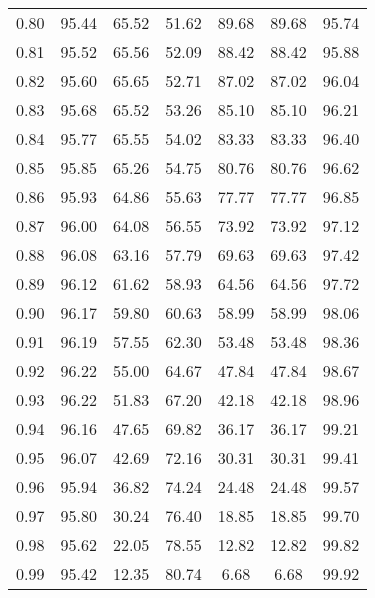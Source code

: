 \begin{tabular}{|c|c|c|c|c|c|c|}
      0.80 &     95.44 &     65.52 &      51.62 &   89.68 &      89.68 &         95.74 \\
      0.81 &     95.52 &     65.56 &      52.09 &   88.42 &      88.42 &         95.88 \\
      0.82 &     95.60 &     65.65 &      52.71 &   87.02 &      87.02 &         96.04 \\
      0.83 &     95.68 &     65.52 &      53.26 &   85.10 &      85.10 &         96.21 \\
      0.84 &     95.77 &     65.55 &      54.02 &   83.33 &      83.33 &         96.40 \\
      0.85 &     95.85 &     65.26 &      54.75 &   80.76 &      80.76 &         96.62 \\
      0.86 &     95.93 &     64.86 &      55.63 &   77.77 &      77.77 &         96.85 \\
      0.87 &     96.00 &     64.08 &      56.55 &   73.92 &      73.92 &         97.12 \\
      0.88 &     96.08 &     63.16 &      57.79 &   69.63 &      69.63 &         97.42 \\
      0.89 &     96.12 &     61.62 &      58.93 &   64.56 &      64.56 &         97.72 \\
      0.90 &     96.17 &     59.80 &      60.63 &   58.99 &      58.99 &         98.06 \\
      0.91 &     96.19 &     57.55 &      62.30 &   53.48 &      53.48 &         98.36 \\
      0.92 &     96.22 &     55.00 &      64.67 &   47.84 &      47.84 &         98.67 \\
      0.93 &     96.22 &     51.83 &      67.20 &   42.18 &      42.18 &         98.96 \\
      0.94 &     96.16 &     47.65 &      69.82 &   36.17 &      36.17 &         99.21 \\
      0.95 &     96.07 &     42.69 &      72.16 &   30.31 &      30.31 &         99.41 \\
      0.96 &     95.94 &     36.82 &      74.24 &   24.48 &      24.48 &         99.57 \\
      0.97 &     95.80 &     30.24 &      76.40 &   18.85 &      18.85 &         99.70 \\
      0.98 &     95.62 &     22.05 &      78.55 &   12.82 &      12.82 &         99.82 \\
      0.99 &     95.42 &     12.35 &      80.74 &    6.68 &       6.68 &         99.92 \\
\bottomrule
\end{tabular}
